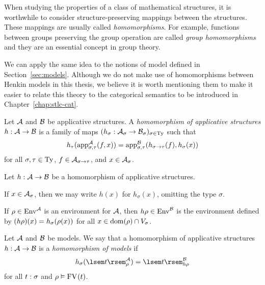 When studying the properties of a class of mathematical structures, it is worthwhile to consider structure-preserving mappings between the structures. These mappings are usually called \textit{homomorphisms}. For example, functions between groups preserving the group operation are called \textit{group homomorphisms} and they are an essential concept in group theory.

We can apply the same idea to the notions of model defined in Section~\ref{sec:models}. Although we do not make use of homomorphisms between Henkin models in this thesis, we believe it is worth mentioning them to make it easier to relate this theory to the categorical semantics to be introduced in Chapter~\ref{chap:stlc-cat}.

\begin{defn}
Let $\struct{A}$ and $\struct{B}$ be applicative structures. A \emph{homomorphism of applicative structures} $h : \struct{A} \to \struct{B}$ is a family of maps $(h_\sigma : \scomp{\struct{A}}{\sigma} \to \scomp{\struct{B}}{\sigma})_{\sigma \in \Ty}$ such that
\[ h_\tau(\sapp[\sigma,\tau][\struct{A}](f, x)) =
    \sapp[\sigma,\tau][\struct{B}](h_{\functy{\sigma}{\tau}}(f), h_\sigma(x)) \]
for all $\sigma, \tau \in \Ty$, $f \in \scomp{\struct{A}}{\functy{\sigma}{\tau}}$, and $x \in \scomp{\struct{A}}{\sigma}$.
\end{defn}

\begin{notn}
Let $h : \struct{A} \to \struct{B}$ be a homomorphism of applicative structures.
\begin{items}
\item If $x \in \scomp{\struct{A}}{\sigma}$, then we may write $h(x)$ for $h_\sigma(x)$, omitting the type $\sigma$.
\item If $\rho \in \Env[][\struct{A}]$ is an environment for $\struct{A}$, then $\mapenv{h}{\rho} \in \Env[][\struct{B}]$ is the environment defined by $(\mapenv{h}{\rho})(x) = h_\sigma(\rho(x))$ for all $x \in \dom{\rho} \cap \Var[\sigma]$.
\end{items}
\end{notn}

\begin{defn}
Let $\struct{A}$ and $\struct{B}$ be models. We say that a homomorphism of applicative structures $h : \struct{A} \to \struct{B}$ is a \emph{homomorphism of models} if
\[ h_\sigma(\sint[\struct{A}]{t}{\rho}) = \sint[\struct{B}]{t}{\mapenv{h}{\rho}} \]
for all $\typedtm{t}{\sigma}$ and $\typedenv{\rho}{\FV{t}}$.
\end{defn}

